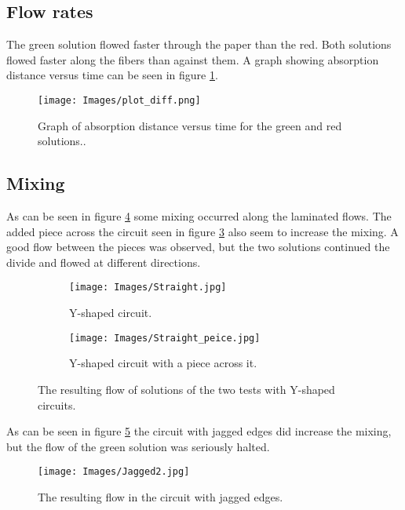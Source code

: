 \newcommand\subSizeO{0.43}
\newcommand\subSizeI{0.9}
\newcommand\figSize{0.7}

\subsection{Flow rates}
The green solution flowed faster through the paper than the red. Both solutions flowed faster along the fibers than against them. A graph showing absorption distance versus time can be seen in figure \ref{fig:diff}.

\begin{figure}[H]
    \centering
    \texttt{[image: Images/plot\_diff.png]}
    \caption{Graph of absorption distance versus time for the green and red solutions..}
    \label{fig:diff}
\end{figure}

\subsection{Mixing}
As can be seen in figure \ref{fig:y} some mixing occurred along the laminated flows. The added piece across the circuit seen in figure \ref{fig:sub:y-} also seem to increase the mixing. A good flow between the pieces was observed, but the two solutions continued the divide and flowed at different directions.

\begin{figure}[H]
\centering
\begin{subfigure}[b]{\subSizeO\textwidth}
  \centering
  \texttt{[image: Images/Straight.jpg]}
  \caption{Y-shaped circuit.}
  \label{fig:sub:y}
\end{subfigure}%
\begin{subfigure}[b]{\subSizeO \textwidth}
  \centering
  \texttt{[image: Images/Straight\_peice.jpg]}
  \caption{Y-shaped circuit with a piece across it.}
  \label{fig:sub:y-}
\end{subfigure}
\caption{The resulting flow of solutions of the two tests with Y-shaped circuits.}
\label{fig:y}
\end{figure}

As can be seen in figure \ref{fig:jagged} the circuit with jagged edges did increase the mixing, but the flow of the green solution was seriously halted.

\begin{figure}[H]
    \centering
    \texttt{[image: Images/Jagged2.jpg]}
    \caption{The resulting flow in the circuit with jagged edges.}
    \label{fig:jagged}
\end{figure}

